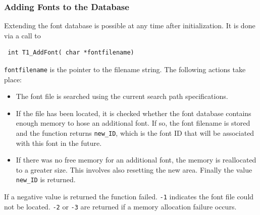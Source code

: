 \subsubsection{Adding Fonts to the Database} 
\label{addingfonts}%
Extending the font database is possible at any time after initialization. It
is done via a call to 
\precorr
\begin{verbatim}
 int T1_AddFont( char *fontfilename)
\end{verbatim}\postcorr
\verb+fontfilename+ is the pointer to the filename string. The following
actions take place:
\begin{itemize}
\item The font file is searched using the current search path specifications. 
\item If the file has been located, it is checked whether the font database
  contains enough memory to hose an additional font. 
  If so, the font filename
  is stored and the function returns \verb+new_ID+, which is the font ID that
  will be associated with this font in the future. 
\item If there was no free memory for an additional font, the memory is
  reallocated to a greater size. This involves also resetting the new
  area. Finally the value \verb+new_ID+ is returned.
\end{itemize}
If a negative value is returned the function failed. \verb+-1+ indicates the
font file could not be located. \verb+-2+ or \verb+-3+ are returned if a
memory allocation failure occurs.


